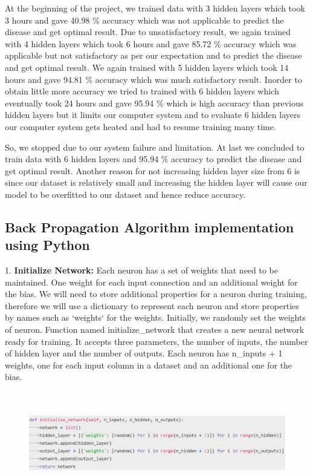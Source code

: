 At the beginning of the project, we trained data with 3 hidden layers which took 3 hours and gave 40.98 \% accuracy which was not applicable to predict the disease and get optimal result.
Due to unsatisfactory result, we again trained with 4 hidden layers which took 6 hours and gave 85.72 \% accuracy which was applicable but not satisfactory as per our expectation and to predict the disease and get optimal result.
We again trained with 5 hidden layers which took 14 hours and gave 94.81 \% accuracy which was much satisfactory result. Inorder to obtain little more accuracy we tried to trained with 6 hidden layers which eventually took 24 hours and gave 95.94 \% which is high accuracy than previous hidden layers but it limits our computer system and to evaluate 6 hidden layers our computer system gets heated and had to resume training many time. \par
So, we stopped due to our system failure and limitation. At last we concluded to train data with 6 hidden layers and 95.94 \% accuracy to predict the disease and get optimal result. 
Another reason for not increasing hidden layer size from 6 is since our dataset is relatively small and increasing the hidden layer will cause our model to be overfitted to our dataset and hence reduce accuracy.




\subsection{Back Propagation Algorithm implementation using Python}

1. \textbf{Initialize Network:}
Each neuron has a set of weights that need to be maintained. One weight for each input connection and an additional weight for the bias. We will need to store additional properties for a neuron during training, therefore we will use a dictionary to represent each neuron and store properties by names such as ‘weights‘ for the weights.
Initially, we randomly set the weights of neuron.\newline
Function named initialize\_network that creates a new neural network ready for training. It accepts three parameters, the number of inputs, the number of  hidden layer and the number of outputs.\newline
Each neuron  has n\_inputs + 1 weights, one for each input column in a dataset and an additional one for the bias.

\begin{figure}[H]
\begin{center}
\includegraphics[width=160mm,height=45mm]{backexplain/initializeNetwork.jpg}
\end{center}
\end{figure}

